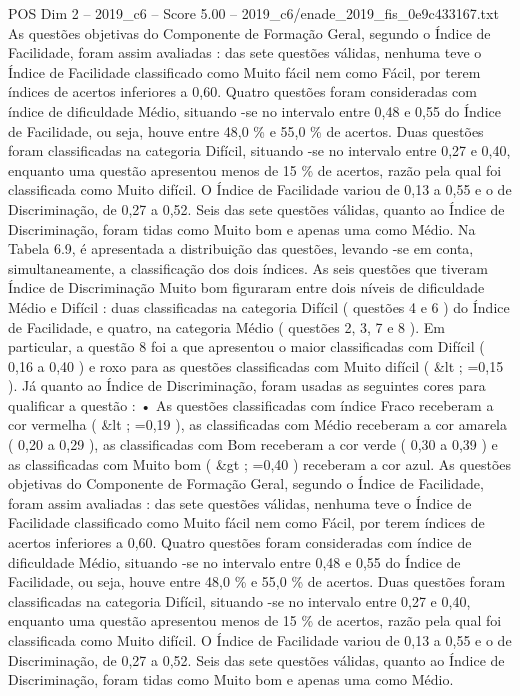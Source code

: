 \begin{textsample}{POS Dim 2 – 2019\_c6 – Score 5.00 – 2019\_c6/enade\_2019\_fis\_0e9c433167.txt}
As questões objetivas do Componente de Formação Geral, segundo o Índice de Facilidade, foram assim avaliadas : das sete questões válidas, nenhuma teve o Índice de Facilidade classificado como Muito fácil nem como Fácil, por terem índices de acertos inferiores a 0,60.
Quatro questões foram consideradas com índice de dificuldade Médio, situando -se no intervalo entre 0,48 e 0,55 do Índice de Facilidade, ou seja, houve entre 48,0 \% e 55,0 \% de acertos.
Duas questões foram classificadas na categoria Difícil, situando -se no intervalo entre 0,27 e 0,40, enquanto uma questão apresentou menos de 15 \% de acertos, razão pela qual foi classificada como Muito difícil.
O Índice de Facilidade variou de 0,13 a 0,55 e o de Discriminação, de 0,27 a 0,52.
Seis das sete questões válidas, quanto ao Índice de Discriminação, foram tidas como Muito bom e apenas uma como Médio.
Na Tabela 6.9, é apresentada a distribuição das questões, levando -se em conta, simultaneamente, a classificação dos dois índices.
As seis questões que tiveram Índice de Discriminação Muito bom figuraram entre dois níveis de dificuldade Médio e Difícil : duas classificadas na categoria Difícil ( questões 4 e 6 ) do Índice de Facilidade, e quatro, na categoria Médio ( questões 2, 3, 7 e 8 ).
Em particular, a questão 8 foi a que apresentou o maior classificadas com Difícil ( 0,16 a 0,40 ) e roxo para as questões classificadas com Muito difícil ( \&lt ; =0,15 ).
Já quanto ao Índice de Discriminação, foram usadas as seguintes cores para qualificar a questão : • As questões classificadas com índice Fraco receberam a cor vermelha ( \&lt ; =0,19 ), as classificadas com Médio receberam a cor amarela ( 0,20 a 0,29 ), as classificadas com Bom receberam a cor verde ( 0,30 a 0,39 ) e as classificadas com Muito bom ( \&gt ; =0,40 ) receberam a cor azul.
As questões objetivas do Componente de Formação Geral, segundo o Índice de Facilidade, foram assim avaliadas : das sete questões válidas, nenhuma teve o Índice de Facilidade classificado como Muito fácil nem como Fácil, por terem índices de acertos inferiores a 0,60.
Quatro questões foram consideradas com índice de dificuldade Médio, situando -se no intervalo entre 0,48 e 0,55 do Índice de Facilidade, ou seja, houve entre 48,0 \% e 55,0 \% de acertos.
Duas questões foram classificadas na categoria Difícil, situando -se no intervalo entre 0,27 e 0,40, enquanto uma questão apresentou menos de 15 \% de acertos, razão pela qual foi classificada como Muito difícil.
O Índice de Facilidade variou de 0,13 a 0,55 e o de Discriminação, de 0,27 a 0,52.
Seis das sete questões válidas, quanto ao Índice de Discriminação, foram tidas como Muito bom e apenas uma como Médio.

\end{textsample}
